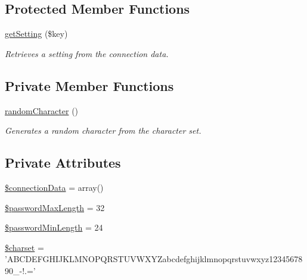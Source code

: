 \subsection*{Protected Member Functions}
\begin{DoxyCompactItemize}
\item 
\hyperlink{classGenericDBM_a539a8700a6814ac460697aef3b7828d1}{get\-Setting} (\$key)
\begin{DoxyCompactList}\small\item\em Retrieves a setting from the connection data. \end{DoxyCompactList}\end{DoxyCompactItemize}
\subsection*{Private Member Functions}
\begin{DoxyCompactItemize}
\item 
\hyperlink{classGenericDBM_af8414dad80ef247872a22aee679f3177}{random\-Character} ()
\begin{DoxyCompactList}\small\item\em Generates a random character from the character set. \end{DoxyCompactList}\end{DoxyCompactItemize}
\subsection*{Private Attributes}
\begin{DoxyCompactItemize}
\item 
\hyperlink{classGenericDBM_ac71262dc922fc26058b54ec18d900a1e}{\$connection\-Data} = array()
\item 
\hyperlink{classGenericDBM_abbad97a2774e974cc2b47741ca50a619}{\$password\-Max\-Length} = 32
\item 
\hyperlink{classGenericDBM_a072e4cac6e6f77ce456ce0396e5b11dd}{\$password\-Min\-Length} = 24
\item 
\hyperlink{classGenericDBM_ad63981b6ff22900da89b1e880a5a1420}{\$charset} = 'A\-B\-C\-D\-E\-F\-G\-H\-I\-J\-K\-L\-M\-N\-O\-P\-Q\-R\-S\-T\-U\-V\-W\-X\-Y\-Zabcdefghijklmnopqrstuvwxyz1234567890\-\_\--\/!.='
\end{DoxyCompactItemize}


